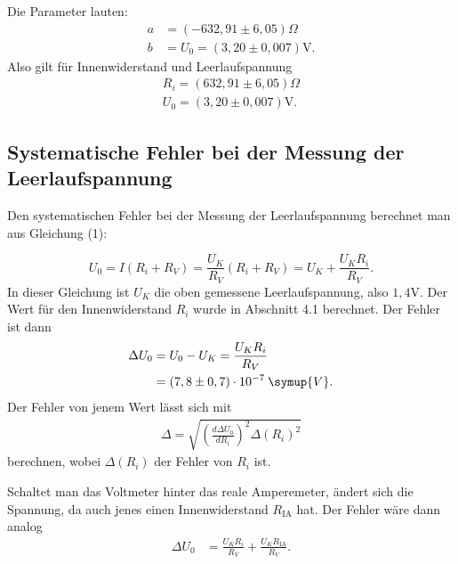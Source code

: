 \noindent Die Parameter lauten:
\begin{align*}
a &= (-632,91 \pm 6,05)\Omega \\
b &= U_0 =  (3,20 \pm 0,007)\si{\volt} .
\end{align*}
Also gilt für Innenwiderstand und Leerlaufspannung
\begin{align*}
R_i = (632,91 \pm 6,05)\Omega \\
U_0 = (3,20 \pm 0,007)\si{\volt} .
\end{align*}


\subsection{Systematische Fehler bei der Messung der Leerlaufspannung}
Den systematischen Fehler bei der Messung der Leerlaufspannung berechnet man aus Gleichung (1):

\begin{equation}
U_0 = I(R_i + R_V) = \frac{U_K}{R_V}(R_i + R_V) = U_K + \frac{U_K R_i}{R_V} .
\end{equation}
In dieser Gleichung ist $U_K$ die oben gemessene Leerlaufspannung, also $1,4 \si{\volt}$.
Der Wert für den Innenwiderstand $R_i$ wurde in Abschnitt 4.1 berechnet. 
Der Fehler ist dann
\begin{align*}
\Delta U_0 &= U_0 - U_K = \frac{U_K R_i}{R_V}  \\
&= (7,8 \pm 0,7) \cdot 10^{-7} \: \symup{V} .
\end{align*}
\noindent Der Fehler von jenem Wert lässt sich mit
\begin{align*}
\Delta = \sqrt{(\frac{d\Delta U_0}{dR_i})^2\Delta (R_i)^2} 
\end{align*}
berechnen, wobei $\Delta (R_i)$ der Fehler von $R_i$ ist.

\noindent Schaltet man das Voltmeter hinter das reale Amperemeter, ändert sich die Spannung, da auch jenes einen Innenwiderstand $R_\text{IA}$ hat.
Der Fehler wäre dann analog
\begin{align*}
\Delta U_0 &= \frac{U_K R_i}{R_V}+\frac{U_K R_\text{IA}}{R_V} .  \\
\end{align*}

